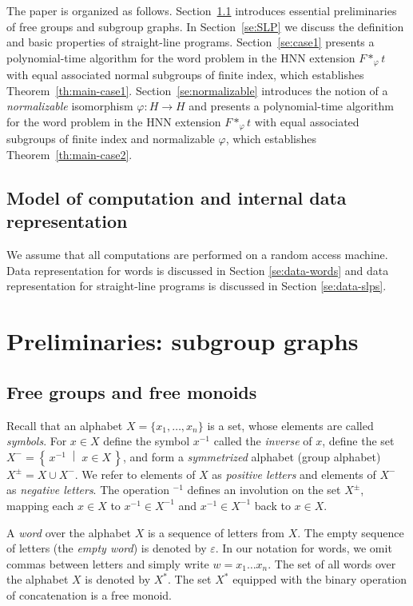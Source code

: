 \documentclass[12pt,oneside]{amsart}
\theoremstyle{definition}
\theoremstyle{case}
\newcommand{\Set}[2]{\left\{\, #1 \;\middle|\; #2 \,\right\}}%
\begin{document}
The paper is organized as follows. 
Section~\ref{se:Freegroups} introduces essential preliminaries of free groups and subgroup graphs.
In Section~\ref{se:SLP} we discuss the definition and basic properties 
of straight-line programs.
Section~\ref{se:case1} presents a polynomial-time algorithm for the word problem
in the HNN extension $F\ast_\varphi t$ 
with equal associated normal subgroups of finite index,
which establishes Theorem~\ref{th:main-case1}.
Section~\ref{se:normalizable} introduces the notion of a \emph{normalizable} 
isomorphism $\varphi \colon H \to H$ and presents a polynomial-time algorithm 
for the word problem in the HNN extension $F \ast_\varphi t$ 
with equal associated subgroups of finite index and normalizable $\varphi$, 
which establishes Theorem~\ref{th:main-case2}.

\subsection{Model of computation and internal data representation}
We assume that all computations are performed on a random access machine.
Data representation for words is discussed in Section \ref{se:data-words} 
and data representation for straight-line programs is discussed 
in Section \ref{se:data-slps}.


\section{Preliminaries: subgroup graphs}
\label{se:sbgp-graphs}

\subsection{Free groups and free monoids}
\label{se:Freegroups}


Recall that an alphabet $X=\{x_1,\dots,x_n\}$ is a set, 
whose elements are called \emph{symbols}.
For $x\in X$ define the symbol $x^{-1}$ called the \emph{inverse} of $x$,
define the set $X^{-}=\Set{x^{-1}}{x\in X}$,
and form a \emph{symmetrized} alphabet 
(group alphabet)
$X^{\pm}=X\cup X^{-}$.
We refer to elements of $X$ as \emph{positive letters} and 
elements of $X^{-}$ as \emph{negative letters}.
The operation ${}^{-1}$ defines an involution on the set $X^\pm$,
mapping each $x\in X$ to $x^{-1}\in X^{-1}$ and 
$x^{-1}\in X^{-1}$ back to $x\in X$.

A \emph{word} over the alphabet $X$ is a sequence of letters from $X$.
The empty sequence of letters (the \emph{empty word}) is denoted by $\varepsilon$.
In our notation for words, we omit commas between letters and simply
write $w=x_1\dots x_n$.
The set of all words over the alphabet $X$ is denoted by $X^\ast$.
The set $X^\ast$ equipped with the binary operation of concatenation
is a free monoid.
\end{document}
